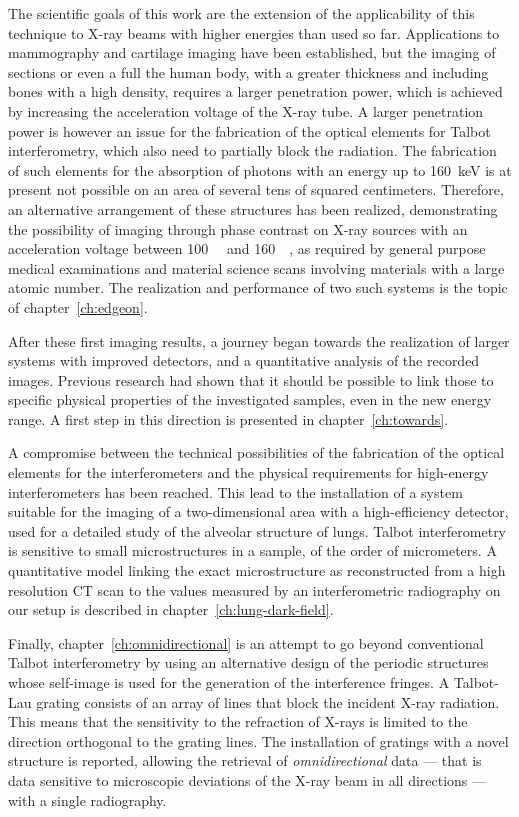 The scientific goals of this work are the extension of the applicability of
this technique to X-ray beams with higher energies than used so far.
Applications to mammography and cartilage imaging have been established, but
the imaging of sections or even a full the human body, with a greater thickness
and including bones with a high density, requires a larger penetration
power, which is achieved by increasing the acceleration voltage of the X-ray
tube. A larger penetration power is however an issue for the fabrication of
the optical elements for Talbot interferometry, which also need to partially block the
radiation. The fabrication of such elements for the
absorption of photons with an energy up to \SI{160}{\kilo\eV} is at present
not possible on an area of several tens of squared centimeters. Therefore,
an alternative arrangement of these structures has been realized, demonstrating
the possibility of imaging through phase contrast on X-ray sources with an
acceleration voltage between \SI{100}{\kilo\voltpeak} and
\SI{160}{\kilo\voltpeak}, as required by general purpose medical
examinations and material science scans involving materials with a large
atomic number. The realization and performance of two such systems is the
topic of chapter~\ref{ch:edgeon}.

After these first imaging results, a journey began towards
 the realization of larger systems with improved detectors, 
and a quantitative analysis of the recorded images. Previous research
had shown that it should be possible to link those to specific physical
properties of the investigated samples, even in the new energy range. A first step
in this direction is presented in chapter~\ref{ch:towards}.

A compromise between the technical possibilities of the
fabrication of the optical elements for the interferometers and the physical
requirements for high-energy interferometers has been reached.
This lead to the installation of a system suitable for the imaging of a two-dimensional
area with a high-efficiency detector, used for a detailed
study of the alveolar structure of lungs. Talbot interferometry is sensitive to
small microstructures in a sample, of the order of micrometers. A
quantitative model linking the exact microstructure as reconstructed from a
high resolution \ac{CT} scan to the values measured by an interferometric
radiography on our setup is described in chapter~\ref{ch:lung-dark-field}.

Finally, chapter~\ref{ch:omnidirectional} is an attempt to go beyond
conventional Talbot interferometry by using an alternative design of the
periodic structures whose self-image is used for the generation of the
interference fringes. A Talbot-Lau grating consists of an array of lines that block the
incident X-ray radiation. This means that the sensitivity to the refraction
of X-rays is limited to the
direction orthogonal to
the grating lines. The installation of gratings with a novel structure is
reported, allowing the retrieval of \emph{omnidirectional} data --- that is
data sensitive to microscopic deviations of the X-ray beam in all directions
--- with a single radiography.
